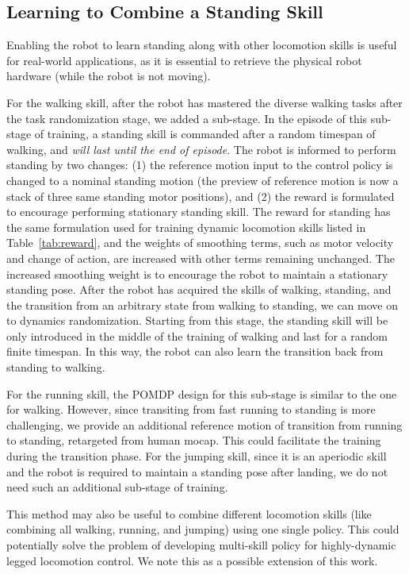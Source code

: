 {\subsection{Learning to Combine a Standing Skill}\label{appendix:transition_to_stand}
Enabling the robot to learn standing along with other locomotion skills is useful for real-world applications, as it is essential to retrieve the physical robot hardware (while the robot is not moving). 

For the walking skill, after the robot has mastered the diverse walking tasks after the task randomization stage, we added a sub-stage. 
In the episode of this sub-stage of training, a standing skill is commanded after a random timespan of walking, and \emph{will last until the end of episode}. The robot is informed to perform standing by two changes: (1) the reference motion input to the control policy is changed to a nominal standing motion (the preview of reference motion is now a stack of three same standing motor positions), and (2) the reward is formulated to encourage performing stationary standing skill. 
The reward for standing has the same formulation used for training dynamic locomotion skills listed in Table~\ref{tab:reward}, and the weights of smoothing terms, such as motor velocity and change of action, are increased with other terms remaining unchanged.
The increased smoothing weight is to encourage the robot to maintain a stationary standing pose. 
After the robot has acquired the skills of walking, standing, and the transition from an arbitrary state from walking to standing, we can move on to dynamics randomization. 
Starting from this stage, the standing skill will be only introduced in the middle of the training of walking and last for a random finite timespan. In this way, the robot can also learn the transition back from standing to walking.  

For the running skill, the POMDP design for this sub-stage is similar to the one for walking. However, since transiting from fast running to standing is more challenging, we provide an additional reference motion of transition from running to standing, retargeted from human mocap. This could facilitate the training during the transition phase. 
For the jumping skill, since it is an aperiodic skill and the robot is required to maintain a standing pose after landing, we do not need such an additional sub-stage of training.       

This method may also be useful to combine different locomotion skills (like combining all walking, running, and jumping) using one single policy. This could potentially solve the problem of developing multi-skill policy for highly-dynamic legged locomotion control. 
We note this as a possible extension of this work.  



}
